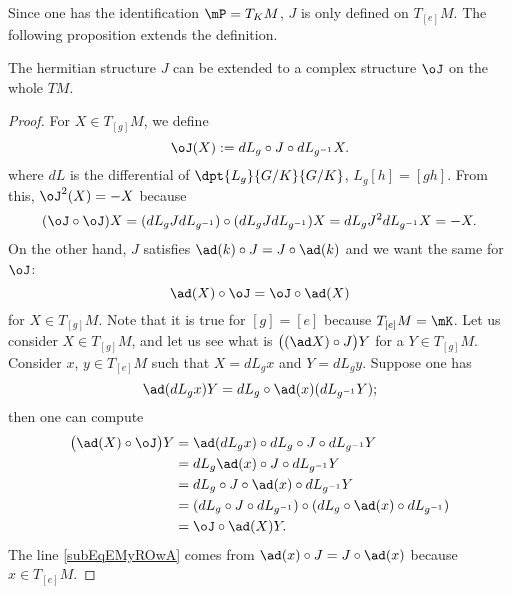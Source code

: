 Since one has the identification $\mP=T_KM$, $J$ is only defined on $T_{[e]}M$. The following proposition extends the definition.

\begin{proposition} \label{prop:ext_J}
    The hermitian structure $J$ can be extended to a complex structure $\oJ$ on the whole $TM$.
\end{proposition}

\begin{proof}
 For $X\in T_{[g]}M$, we define
\begin{equation}
  \oJ(X):=dL_g\circ J\circ dL_{g^{-1}}X.
\end{equation}
where $dL$ is the differential of $\dpt{L_g}{G/K}{G/K}$, $L_g[h]=[gh]$.
From this, $\oJ^2(X)=-X$ because
\begin{equation}
  (\oJ\circ\oJ)X=( dL_g J dL_{g^{-1}} )\circ( dL_g J dL_{g^{-1}} )X
           =dL_g J^2dL_{g^{-1}}X
	   =-X.
\end{equation}
On the other hand, $J$ satisfies $\ad(k)\circ J=J\circ \ad(k)$ and we want the same for $\oJ$:
\[
  \ad(X)\circ\oJ=\oJ\circ\ad(X)
\]
for $X\in T_{[g]}M$. Note that it is true for $[g]=[e]$ because $T_{[e]}M=\mK$. Let us consider $X\in T_{[g]}M$, and let us see what is $ \big( (\ad X)\circ J \big)Y $ for a $Y\in T_{[g]}M$. Consider $x$, $y\in T_{[e]}M$ such that $X=dL_g x$ and $Y=dL_g y$. Suppose one has
\begin{equation}\label{eq:suppose}
   \ad(dL_g x)Y=dL_g\circ\ad(x)(dL_{g^{-1}}Y);
\end{equation}
then one can compute
\begin{subequations}
    \begin{align}
\big(  \ad(X)\circ\oJ \big)Y&=\ad(dL_g x)\circ dL_g\circ J\circ dL_{g^{-1}}Y\\
&=dL_g\ad(x) \circ J\circ dL_{g^{-1}}Y\label{subEqEMyROwA}\\
	                    &=dL_g\circ J\circ\ad(x)\circ dL_{g^{-1}}Y\\
			    &=(dL_g\circ J\circ dL_{g^{-1}})\circ (dL_g\circ\ad(x)\circ dL_{g^{-1}})\\
			    &=\oJ\circ\ad(X)Y.
    \end{align}
\end{subequations}
The line \eqref{subEqEMyROwA} comes from $\ad(x)\circ J=J\circ\ad(x)$ because $x\in T_{[e]}M$.


\end{proof}
